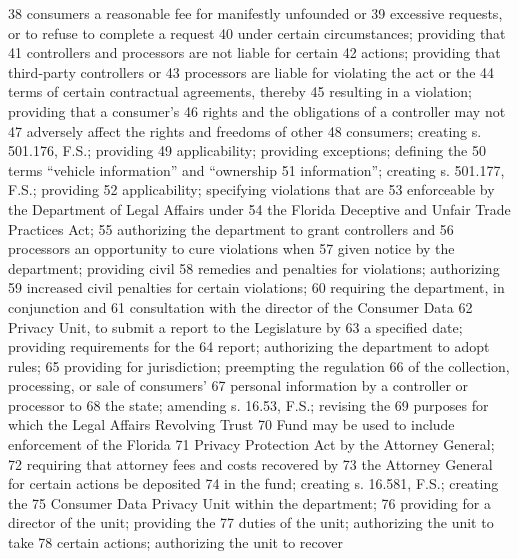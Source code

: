    38         consumers a reasonable fee for manifestly unfounded or
   39         excessive requests, or to refuse to complete a request
   40         under certain circumstances; providing that
   41         controllers and processors are not liable for certain
   42         actions; providing that third-party controllers or
   43         processors are liable for violating the act or the
   44         terms of certain contractual agreements, thereby
   45         resulting in a violation; providing that a consumer’s
   46         rights and the obligations of a controller may not
   47         adversely affect the rights and freedoms of other
   48         consumers; creating s. 501.176, F.S.; providing
   49         applicability; providing exceptions; defining the
   50         terms “vehicle information” and “ownership
   51         information”; creating s. 501.177, F.S.; providing
   52         applicability; specifying violations that are
   53         enforceable by the Department of Legal Affairs under
   54         the Florida Deceptive and Unfair Trade Practices Act;
   55         authorizing the department to grant controllers and
   56         processors an opportunity to cure violations when
   57         given notice by the department; providing civil
   58         remedies and penalties for violations; authorizing
   59         increased civil penalties for certain violations;
   60         requiring the department, in conjunction and
   61         consultation with the director of the Consumer Data
   62         Privacy Unit, to submit a report to the Legislature by
   63         a specified date; providing requirements for the
   64         report; authorizing the department to adopt rules;
   65         providing for jurisdiction; preempting the regulation
   66         of the collection, processing, or sale of consumers’
   67         personal information by a controller or processor to
   68         the state; amending s. 16.53, F.S.; revising the
   69         purposes for which the Legal Affairs Revolving Trust
   70         Fund may be used to include enforcement of the Florida
   71         Privacy Protection Act by the Attorney General;
   72         requiring that attorney fees and costs recovered by
   73         the Attorney General for certain actions be deposited
   74         in the fund; creating s. 16.581, F.S.; creating the
   75         Consumer Data Privacy Unit within the department;
   76         providing for a director of the unit; providing the
   77         duties of the unit; authorizing the unit to take
   78         certain actions; authorizing the unit to recover
